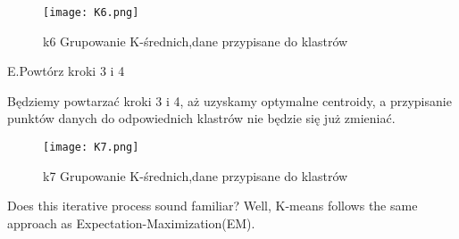 \begin{figure}[!h]
    \label{fig:k6}
    \centering \texttt{[image: K6.png]}
    \caption{k6 Grupowanie K-średnich,dane przypisane do klastrów\cite{clust2020}}
\end{figure}
\newpage
     E.Powtórz kroki 3 i 4

Będziemy powtarzać kroki 3 i 4, aż uzyskamy optymalne centroidy, a przypisanie punktów danych do odpowiednich klastrów nie będzie się już zmieniać.
\begin{figure}[!h]
    \label{fig:k7}
    \centering \texttt{[image: K7.png]}
    \caption{k7 Grupowanie K-średnich,dane przypisane do klastrów\cite{clust2020}}
\end{figure}

Does this iterative process sound familiar? Well, K-means follows the same approach as Expectation-Maximization(EM). \cite{clust2020}

\newpage


